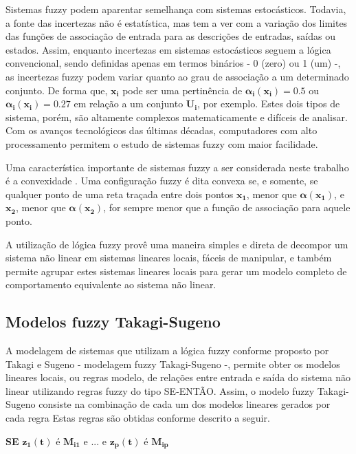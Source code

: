 Sistemas fuzzy podem aparentar semelhança com sistemas estocásticos. Todavia, a fonte das incertezas não é estatística, mas tem a ver com a variação dos limites das funções de associação de entrada para as descrições de entradas, saídas ou estados. Assim, enquanto incertezas em sistemas estocásticos seguem a lógica convencional, sendo definidas apenas em termos binários - 0 (zero) ou 1 (um) -, as incertezas fuzzy podem variar quanto ao grau de associação a um determinado conjunto. De forma que, $\mathbf{x_i}$ pode ser uma pertinência de  $\mathbf{\alpha_i(x_i) = 0.5}$ ou $\mathbf{\alpha_i(x_i) = 0.27}$ em relação a um conjunto $\mathbf{U_i}$, por exemplo. Estes dois tipos de sistema, porém, são altamente complexos matematicamente e difíceis de analisar. Com os avanços tecnológicos das últimas décadas, computadores com alto processamento permitem o estudo de sistemas fuzzy com maior facilidade.

Uma característica importante de sistemas fuzzy a ser considerada neste trabalho é a convexidade \cite{article:zadeh:1990}. Uma configuração fuzzy é dita convexa se, e somente, se qualquer ponto de uma reta traçada entre dois pontos $\mathbf{x_1}$, menor que $\mathbf{\alpha(x_1)}$, e $\mathbf{x_2}$, menor que $\mathbf{\alpha(x_2)}$, for sempre menor que a função de associação para aquele ponto.

A utilização de lógica fuzzy provê uma maneira simples e direta de decompor um sistema não linear em sistemas lineares locais, fáceis de manipular, e também permite agrupar estes sistemas lineares locais para gerar um modelo completo de comportamento equivalente ao sistema não linear.

\subsection{Modelos fuzzy Takagi-Sugeno}\label{Modelo-fuzzy-TS}

A modelagem de sistemas que utilizam a lógica fuzzy conforme proposto por Takagi e Sugeno \cite{booktw:2003} - modelagem fuzzy Takagi-Sugeno -, permite obter os modelos lineares locais, ou regras modelo, de relações entre entrada e saída do sistema não linear utilizando regras fuzzy do tipo SE-ENT\~{A}O. Assim, o modelo fuzzy Takagi-Sugeno consiste na combinação de cada um dos modelos lineares gerados por cada regra
Estas regras são obtidas conforme descrito a seguir.

\textbf{SE} $\mathbf{ z_1(t)}$ é $\mathbf{M_{i1}}$ e ... e $\mathbf{ z_p(t)}$ é $\mathbf{M_{ip}}$

